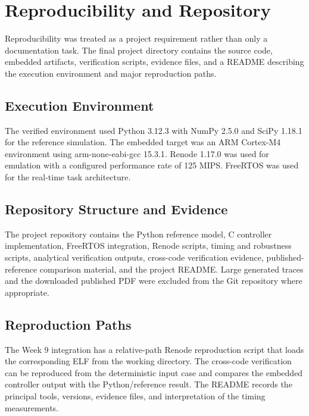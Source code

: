 \documentclass[11pt,a4paper]{article}
\begin{document}
\section{Reproducibility and Repository}

Reproducibility was treated as a project requirement rather than only a documentation task. The final project directory contains the source code, embedded artifacts, verification scripts, evidence files, and a README describing the execution environment and major reproduction paths.

\subsection{Execution Environment}

The verified environment used Python 3.12.3 with NumPy 2.5.0 and SciPy 1.18.1 for the reference simulation\cite{python,scipy}. The embedded target was an ARM Cortex-M4 environment using arm-none-eabi-gcc 15.3.1\cite{arm_m4_trm,arm_m4_data}. Renode 1.17.0 was used for emulation with a configured performance rate of 125 MIPS\cite{renode_time,renode_exec,renode_metrics}. FreeRTOS was used for the real-time task architecture\cite{freertos_task,freertos_manual}.

\subsection{Repository Structure and Evidence}

The project repository contains the Python reference model, C controller implementation, FreeRTOS integration, Renode scripts, timing and robustness scripts, analytical verification outputs, cross-code verification evidence, published-reference comparison material, and the project README. Large generated traces and the downloaded published PDF were excluded from the Git repository where appropriate.

\subsection{Reproduction Paths}

The Week 9 integration has a relative-path Renode reproduction script that loads the corresponding ELF from the working directory. The cross-code verification can be reproduced from the deterministic input case and compares the embedded controller output with the Python/reference result. The README records the principal tools, versions, evidence files, and interpretation of the timing measurements.
\end{document}
